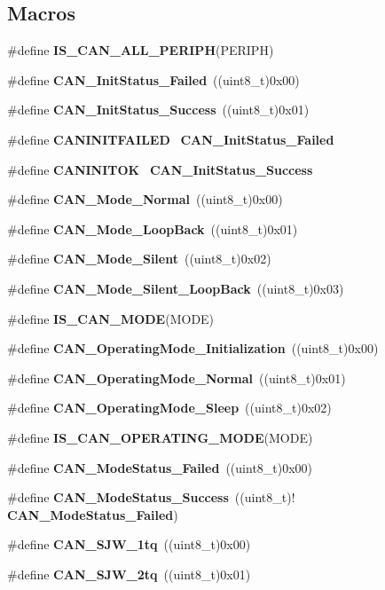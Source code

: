 \subsection*{Macros}
\begin{DoxyCompactItemize}
\item 
\#define \textbf{ I\+S\+\_\+\+C\+A\+N\+\_\+\+A\+L\+L\+\_\+\+P\+E\+R\+I\+PH}(P\+E\+R\+I\+PH)
\item 
\#define \textbf{ C\+A\+N\+\_\+\+Init\+Status\+\_\+\+Failed}~((uint8\+\_\+t)0x00)
\item 
\#define \textbf{ C\+A\+N\+\_\+\+Init\+Status\+\_\+\+Success}~((uint8\+\_\+t)0x01)
\item 
\#define \textbf{ C\+A\+N\+I\+N\+I\+T\+F\+A\+I\+L\+ED}~\textbf{ C\+A\+N\+\_\+\+Init\+Status\+\_\+\+Failed}
\item 
\#define \textbf{ C\+A\+N\+I\+N\+I\+T\+OK}~\textbf{ C\+A\+N\+\_\+\+Init\+Status\+\_\+\+Success}
\item 
\#define \textbf{ C\+A\+N\+\_\+\+Mode\+\_\+\+Normal}~((uint8\+\_\+t)0x00)
\item 
\#define \textbf{ C\+A\+N\+\_\+\+Mode\+\_\+\+Loop\+Back}~((uint8\+\_\+t)0x01)
\item 
\#define \textbf{ C\+A\+N\+\_\+\+Mode\+\_\+\+Silent}~((uint8\+\_\+t)0x02)
\item 
\#define \textbf{ C\+A\+N\+\_\+\+Mode\+\_\+\+Silent\+\_\+\+Loop\+Back}~((uint8\+\_\+t)0x03)
\item 
\#define \textbf{ I\+S\+\_\+\+C\+A\+N\+\_\+\+M\+O\+DE}(M\+O\+DE)
\item 
\#define \textbf{ C\+A\+N\+\_\+\+Operating\+Mode\+\_\+\+Initialization}~((uint8\+\_\+t)0x00)
\item 
\#define \textbf{ C\+A\+N\+\_\+\+Operating\+Mode\+\_\+\+Normal}~((uint8\+\_\+t)0x01)
\item 
\#define \textbf{ C\+A\+N\+\_\+\+Operating\+Mode\+\_\+\+Sleep}~((uint8\+\_\+t)0x02)
\item 
\#define \textbf{ I\+S\+\_\+\+C\+A\+N\+\_\+\+O\+P\+E\+R\+A\+T\+I\+N\+G\+\_\+\+M\+O\+DE}(M\+O\+DE)
\item 
\#define \textbf{ C\+A\+N\+\_\+\+Mode\+Status\+\_\+\+Failed}~((uint8\+\_\+t)0x00)
\item 
\#define \textbf{ C\+A\+N\+\_\+\+Mode\+Status\+\_\+\+Success}~((uint8\+\_\+t)!\textbf{ C\+A\+N\+\_\+\+Mode\+Status\+\_\+\+Failed})
\item 
\#define \textbf{ C\+A\+N\+\_\+\+S\+J\+W\+\_\+1tq}~((uint8\+\_\+t)0x00)
\item 
\#define \textbf{ C\+A\+N\+\_\+\+S\+J\+W\+\_\+2tq}~((uint8\+\_\+t)0x01)

\end{DoxyCompactItemize}

